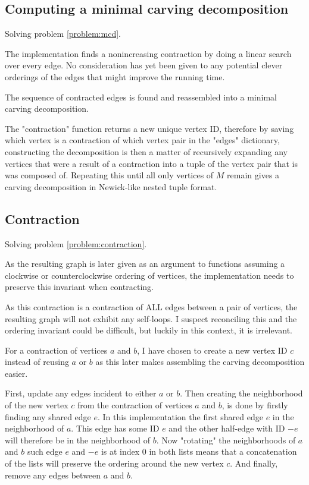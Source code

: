 \documentclass{article}
\begin{document}
	
	\subsection{Computing a minimal carving decomposition}\label{impl:mcd}

		Solving problem \ref{problem:mcd}.

		The implementation finds a nonincreasing contraction by doing a linear search over every edge. No consideration has yet been given to any potential clever orderings of the edges that might improve the running time.

		The sequence of contracted edges is found and reassembled into a minimal carving decomposition.

		The "contraction" function returns a new unique vertex ID, therefore by saving which vertex is a contraction of which vertex pair in the "edges" dictionary, constructing the decomposition is then a matter of recursively expanding any vertices that were a result of a contraction into a tuple of the vertex pair that is was composed of. Repeating this until all only vertices of $M$ remain gives a carving decomposition in Newick-like nested tuple format.


	\subsection{Contraction}\label{impl:contraction}

		Solving problem \ref{problem:contraction}.

		As the resulting graph is later given as an argument to functions assuming a clockwise or counterclockwise ordering of vertices, the implementation needs to preserve this invariant when contracting.

		As this contraction is a contraction of ALL edges between a pair of vertices, the resulting graph will not exhibit any self-loops. I suspect reconciling this and the ordering invariant could be difficult, but luckily in this context, it is irrelevant.

		For a contraction of vertices $a$ and $b$, I have chosen to create a new vertex ID $c$ instead of reusing $a$ or $b$ as this later makes assembling the carving decomposition easier.

		First, update any edges incident to either $a$ or $b$. Then creating the neighborhood of the new vertex $c$ from the contraction of vertices $a$ and $b$, is done by firstly finding any shared edge $e$. In this implementation the first shared edge $e$ in the neighborhood of $a$. This edge has some ID $e$ and the other half-edge with ID $-e$ will therefore be in the neighborhood of $b$. Now  "rotating" the neighborhoods of $a$ and $b$ such edge $e$ and $-e$ is at index 0 in both lists means that a concatenation of the lists will preserve the ordering around the new vertex $c$. And finally, remove any edges between $a$ and $b$.
		
\end{document}

